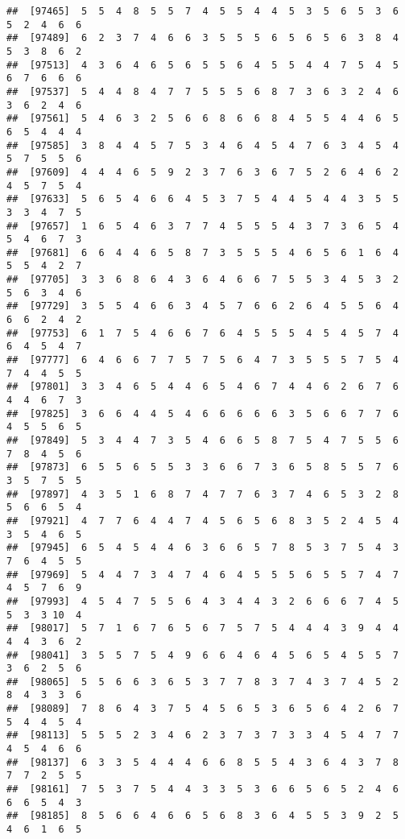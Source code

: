 \documentclass[
]{book}
\begin{document}
\begin{verbatim}
##  [97465]  5  5  4  8  5  5  7  4  5  5  4  4  5  3  5  6  5  3  6  5  2  4  6  6
##  [97489]  6  2  3  7  4  6  6  3  5  5  5  6  5  6  5  6  3  8  4  5  3  8  6  2
##  [97513]  4  3  6  4  6  5  6  5  5  6  4  5  5  4  4  7  5  4  5  6  7  6  6  6
##  [97537]  5  4  4  8  4  7  7  5  5  5  6  8  7  3  6  3  2  4  6  3  6  2  4  6
##  [97561]  5  4  6  3  2  5  6  6  8  6  6  8  4  5  5  4  4  6  5  6  5  4  4  4
##  [97585]  3  8  4  4  5  7  5  3  4  6  4  5  4  7  6  3  4  5  4  5  7  5  5  6
##  [97609]  4  4  4  6  5  9  2  3  7  6  3  6  7  5  2  6  4  6  2  4  5  7  5  4
##  [97633]  5  6  5  4  6  6  4  5  3  7  5  4  4  5  4  4  3  5  5  3  3  4  7  5
##  [97657]  1  6  5  4  6  3  7  7  4  5  5  5  4  3  7  3  6  5  4  5  4  6  7  3
##  [97681]  6  6  4  4  6  5  8  7  3  5  5  5  4  6  5  6  1  6  4  5  5  4  2  7
##  [97705]  3  3  6  8  6  4  3  6  4  6  6  7  5  5  3  4  5  3  2  5  6  3  4  6
##  [97729]  3  5  5  4  6  6  3  4  5  7  6  6  2  6  4  5  5  6  4  6  6  2  4  2
##  [97753]  6  1  7  5  4  6  6  7  6  4  5  5  5  4  5  4  5  7  4  6  4  5  4  7
##  [97777]  6  4  6  6  7  7  5  7  5  6  4  7  3  5  5  5  7  5  4  7  4  4  5  5
##  [97801]  3  3  4  6  5  4  4  6  5  4  6  7  4  4  6  2  6  7  6  4  4  6  7  3
##  [97825]  3  6  6  4  4  5  4  6  6  6  6  6  3  5  6  6  7  7  6  4  5  5  6  5
##  [97849]  5  3  4  4  7  3  5  4  6  6  5  8  7  5  4  7  5  5  6  7  8  4  5  6
##  [97873]  6  5  5  6  5  5  3  3  6  6  7  3  6  5  8  5  5  7  6  3  5  7  5  5
##  [97897]  4  3  5  1  6  8  7  4  7  7  6  3  7  4  6  5  3  2  8  5  6  6  5  4
##  [97921]  4  7  7  6  4  4  7  4  5  6  5  6  8  3  5  2  4  5  4  3  5  4  6  5
##  [97945]  6  5  4  5  4  4  6  3  6  6  5  7  8  5  3  7  5  4  3  7  6  4  5  5
##  [97969]  5  4  4  7  3  4  7  4  6  4  5  5  5  6  5  5  7  4  7  4  5  7  6  9
##  [97993]  4  5  4  7  5  5  6  4  3  4  4  3  2  6  6  6  7  4  5  5  3  3 10  4
##  [98017]  5  7  1  6  7  6  5  6  7  5  7  5  4  4  4  3  9  4  4  4  4  3  6  2
##  [98041]  3  5  5  7  5  4  9  6  6  4  6  4  5  6  5  4  5  5  7  3  6  2  5  6
##  [98065]  5  5  6  6  3  6  5  3  7  7  8  3  7  4  3  7  4  5  2  8  4  3  3  6
##  [98089]  7  8  6  4  3  7  5  4  5  6  5  3  6  5  6  4  2  6  7  5  4  4  5  4
##  [98113]  5  5  5  2  3  4  6  2  3  7  3  7  3  3  4  5  4  7  7  4  5  4  6  6
##  [98137]  6  3  3  5  4  4  4  6  6  8  5  5  4  3  6  4  3  7  8  7  7  2  5  5
##  [98161]  7  5  3  7  5  4  4  3  3  5  3  6  6  5  6  5  2  4  6  6  6  5  4  3
##  [98185]  8  5  6  6  4  6  6  5  6  8  3  6  4  5  5  3  9  2  5  4  6  1  6  5

\end{verbatim}
\end{document}
